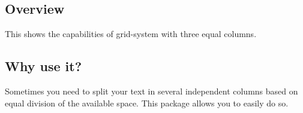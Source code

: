 \documentclass[DIV12]{scrartcl}
\begin{document}
\bigskip

\begin{row}{3}
	\begin{cell}{1}
	\section*{Overview}
	\vspace{-1.5ex}
	This shows the capabilities of grid-system with three equal columns.
	\end{cell}
	\begin{cell}{2}
	\section*{Why use it?}
	\vspace{-1.5ex}
	Sometimes you need to split your text in several independent columns based on equal division of the available space. This package allows you to easily do so.
	\end{cell}
\end{row}



\blindtext
\end{document}
